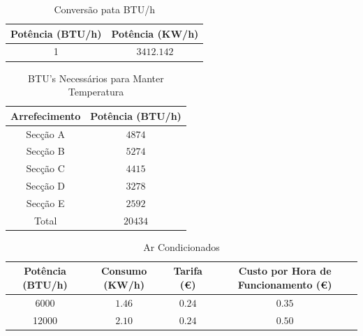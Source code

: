 \documentclass[12pt, a4paper]{article}
\begin{document}
\vspace{10mm}

\begin{table}[htpb]
	\begin{center}
		\begin{tabular}{c c}
			\toprule
			Potência (BTU/h)							 & 	Potência (KW/h)  \\
			\midrule
			1 						               	     & $3412.142$	 \\
			\bottomrule
		\end{tabular}
	\end{center}
	\caption{Conversão pata BTU/h}\label{tab:conversaoBTU}
\end{table}

\vspace{10mm}

\begin{table}[htpb]
	\begin{center}
		\begin{tabular}{c c}
			\toprule
			Arrefecimento 								 & 	Potência (BTU/h) \\
			\midrule
			Secção A 						               	     & $4874$	 \\
			Secção B						               	     & $5274$	 \\
			Secção C						               	     & $4415$	 \\
			Secção D 						               	 	 & $3278$	 \\
			Secção E						               	  	 & $2592$	 \\
			\hline
			Total						             & $20434$	 \\
			\bottomrule
		\end{tabular}
	\end{center}
	\caption{BTU's Necessários para Manter Temperatura}\label{tab:BTUmanter}
\end{table}

\pagebreak


\begin{table}[htpb]
	\begin{center}
		\begin{tabular}{c c c c}
			\toprule
			Potência (BTU/h) 								 & 	Consumo (KW/h) & Tarifa (€)   & Custo por Hora de Funcionamento (€) \\
			\midrule
			6000 						         &    $1.46$      	     	  & $0.24$		   & $0.35$					 \\
			12000 						     &    $2.10$      	     	  & $0.24$		   & $0.50$					 \\
			\bottomrule
		\end{tabular}
	\end{center}
	\caption{Ar Condicionados}\label{tab:arcondicionado}
\end{table}
\end{document}
